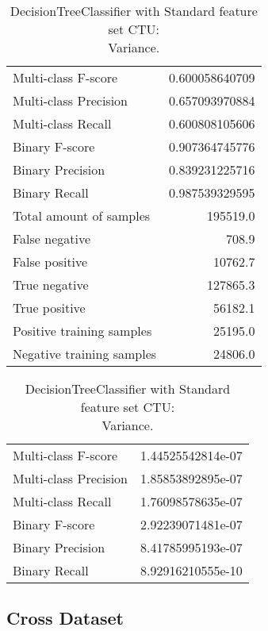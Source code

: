 \begin{table}[H]
\begin{minipage}{0.5\textwidth}
\caption{DecisionTreeClassifier with Standard feature set CTU: \\Average.}
\centering
\begin{tabular}{l r}
\toprule
Multi-class F-score & 0.600058640709 \\
Multi-class Precision & 0.657093970884 \\
Multi-class Recall & 0.600808105606 \\
\midrule
Binary F-score & 0.907364745776 \\
Binary Precision & 0.839231225716 \\
Binary Recall & 0.987539329595 \\
\midrule
Total amount of samples & 195519.0 \\
False negative & 708.9 \\
False positive & 10762.7 \\
True negative & 127865.3 \\
True positive & 56182.1 \\
\midrule
Positive training samples & 25195.0 \\
Negative training samples & 24806.0 \\
\bottomrule
\end{tabular}
\end{minipage}
\hfillx
\begin{minipage}{0.5\textwidth}
\caption{DecisionTreeClassifier with Standard feature set CTU: \\Variance.}
\centering
\begin{tabular}{l r}
\toprule
Multi-class F-score & 1.44525542814e-07 \\
Multi-class Precision & 1.85853892895e-07 \\
Multi-class Recall & 1.76098578635e-07 \\
\midrule
Binary F-score & 2.92239071481e-07 \\
Binary Precision & 8.41785995193e-07 \\
Binary Recall & 8.92916210555e-10 \\
\bottomrule
\end{tabular}
\end{minipage}
\end{table}

\newpage
\subsection{Cross Dataset}


